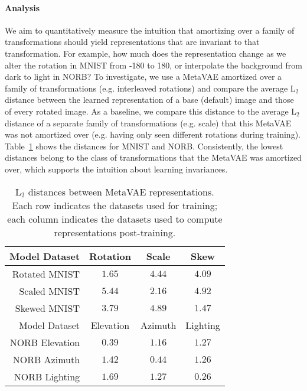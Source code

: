 \paragraph{Analysis}
We aim to quantitatively measure the intuition that amortizing over a family of transformations should yield representations that are invariant to that transformation.
For example, how much does the representation change as we alter the rotation in MNIST from -180 to 180, or interpolate the background from dark to light in NORB? 
To investigate, we use a MetaVAE amortized over a family of transformations (e.g. interleaved rotations) and compare the average
L$_2$ distance between the learned representation of a base (default) image and those of every rotated image. As a baseline, we compare this distance to the average L$_2$ distance of a separate family of transformations (e.g. scale) that this MetaVAE was not amortized over (e.g. having only seen different rotations during training). Table~\ref{table:distance} shows the distances for MNIST and NORB. Consistently, the lowest distances belong to the class of transformations that the MetaVAE was amortized over, which supports the intuition about learning invariances.

\begin{table}[h]
\centering
\begin{tabular}{r|c|c|c}
\toprule
Model Dataset & Rotation & Scale & Skew \\
\midrule
Rotated MNIST & $\mathbf{1.65}$ & $4.44$ & $4.09$ \\ 
Scaled MNIST &  $5.44$ & $\mathbf{2.16}$ & $4.92$ \\  
Skewed MNIST & $3.79$ & $4.89$ & $\mathbf{1.47}$ \\   
\toprule
Model Dataset & Elevation & Azimuth & Lighting \\
\midrule
NORB Elevation & $\mathbf{0.39}$ & $1.16$ & $1.27$ \\ 
NORB Azimuth &  $1.42$ & $\mathbf{0.44}$ & $1.26$ \\  
NORB Lighting & $1.69$ & $1.27$ & $\mathbf{0.26}$ \\
\bottomrule
\end{tabular}
\caption{L$_2$ distances between MetaVAE representations. Each row indicates the datasets  used for training; each column indicates the datasets used to compute representations post-training.}
\label{table:distance}
\end{table}

